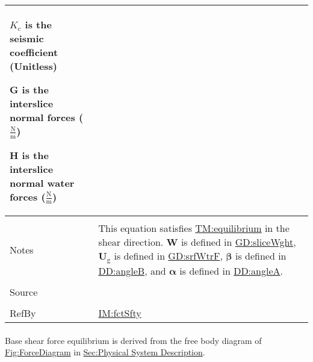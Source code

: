 \documentclass[12pt]{article}
\begin{document}
\begin{minipage}{\textwidth}
\begin{tabular}{>{\raggedright}p{}>{\raggedright\arraybackslash}p{}}
\begin{symbDescription}
              \item{${K_{\text{c}}}$ is the seismic coefficient (Unitless)}
              \item{$\symbf{G}$ is the interslice normal forces ($\frac{\text{N}}{\text{m}}$)}
              \item{$\symbf{H}$ is the interslice normal water forces ($\frac{\text{N}}{\text{m}}$)}
              \end{symbDescription}
\\ \midrule \\
Notes & This equation satisfies \hyperref[TM:equilibrium]{TM:equilibrium} in the shear direction. $\symbf{W}$ is defined in \hyperref[GD:sliceWght]{GD:sliceWght}, ${\symbf{U}_{\text{g}}}$ is defined in \hyperref[GD:srfWtrF]{GD:srfWtrF}, $\symbf{β}$ is defined in \hyperref[DD:angleB]{DD:angleB}, and $\symbf{α}$ is defined in \hyperref[DD:angleA]{DD:angleA}.
        
\\ \midrule \\
Source & \cite{chen2005}
         
\\ \midrule \\
RefBy & \hyperref[IM:fctSfty]{IM:fctSfty}
        
\\ \bottomrule
\end{tabular}
\end{minipage}
\paragraph{}
\label{GD:bsShrFEqDeriv}
Base shear force equilibrium is derived from the free body diagram of \hyperref[Figure:ForceDiagram]{Fig:ForceDiagram} in \hyperref[Sec:PhysSyst]{Sec:Physical System Description}.
\end{document}
